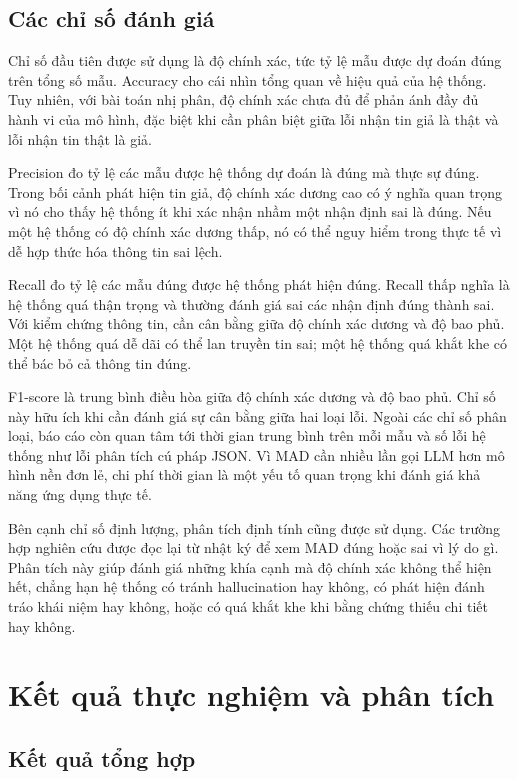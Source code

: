 ﻿\documentclass[oneside,a4paper,12pt]{extreport}
\begin{document}
\section{Các chỉ số đánh giá}

Chỉ số đầu tiên được sử dụng là độ chính xác, tức tỷ lệ mẫu được dự đoán đúng trên tổng số mẫu. Accuracy cho cái nhìn tổng quan về hiệu quả của hệ thống. Tuy nhiên, với bài toán nhị phân, độ chính xác chưa đủ để phản ánh đầy đủ hành vi của mô hình, đặc biệt khi cần phân biệt giữa lỗi nhận tin giả là thật và lỗi nhận tin thật là giả.

Precision đo tỷ lệ các mẫu được hệ thống dự đoán là đúng mà thực sự đúng. Trong bối cảnh phát hiện tin giả, độ chính xác dương cao có ý nghĩa quan trọng vì nó cho thấy hệ thống ít khi xác nhận nhầm một nhận định sai là đúng. Nếu một hệ thống có độ chính xác dương thấp, nó có thể nguy hiểm trong thực tế vì dễ hợp thức hóa thông tin sai lệch.

Recall đo tỷ lệ các mẫu đúng được hệ thống phát hiện đúng. Recall thấp nghĩa là hệ thống quá thận trọng và thường đánh giá sai các nhận định đúng thành sai. Với kiểm chứng thông tin, cần cân bằng giữa độ chính xác dương và độ bao phủ. Một hệ thống quá dễ dãi có thể lan truyền tin sai; một hệ thống quá khắt khe có thể bác bỏ cả thông tin đúng.

F1-score là trung bình điều hòa giữa độ chính xác dương và độ bao phủ. Chỉ số này hữu ích khi cần đánh giá sự cân bằng giữa hai loại lỗi. Ngoài các chỉ số phân loại, báo cáo còn quan tâm tới thời gian trung bình trên mỗi mẫu và số lỗi hệ thống như lỗi phân tích cú pháp JSON. Vì MAD cần nhiều lần gọi LLM hơn mô hình nền đơn lẻ, chi phí thời gian là một yếu tố quan trọng khi đánh giá khả năng ứng dụng thực tế.

Bên cạnh chỉ số định lượng, phân tích định tính cũng được sử dụng. Các trường hợp nghiên cứu được đọc lại từ nhật ký để xem MAD đúng hoặc sai vì lý do gì. Phân tích này giúp đánh giá những khía cạnh mà độ chính xác không thể hiện hết, chẳng hạn hệ thống có tránh hallucination hay không, có phát hiện đánh tráo khái niệm hay không, hoặc có quá khắt khe khi bằng chứng thiếu chi tiết hay không.
\chapter{Kết quả thực nghiệm và phân tích}

\section{Kết quả tổng hợp}
\end{document}
